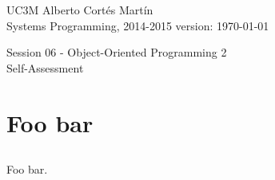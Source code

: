 \documentclass[a4paper, 11pt]{article}
\newcommand{\realtitle}{Session 06 - Object-Oriented Programming 2}
\begin{document}
\makebox[\linewidth]{\rule{\textwidth}{0.4pt}}
UC3M \hfill Alberto Cortés Martín\\
Systems Programming, 2014-2015 \hfill version: \today\\
\makebox[\linewidth]{\rule{\textwidth}{0.4pt}}
\begin{center}
  \Large{\realtitle}\\Self-Assessment
\end{center}
\makebox[\linewidth]{\rule{\textwidth}{0.4pt}}
\vspace{1cm}


\section{Foo bar}

\subsection{}

Foo bar.
\end{document}
